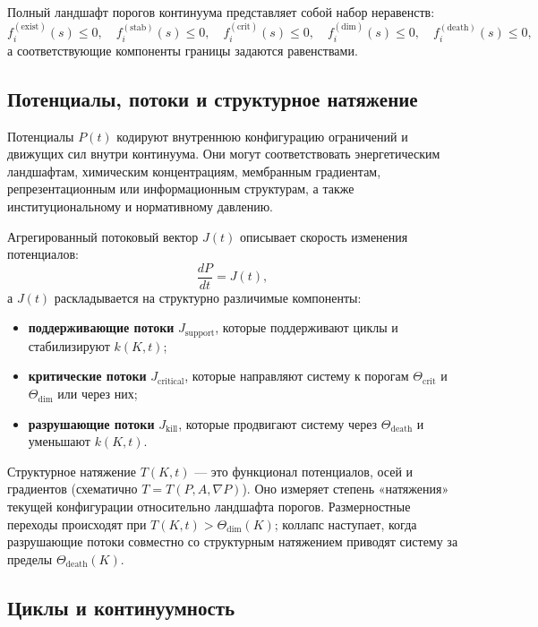 Полный ландшафт порогов континуума представляет собой набор неравенств:
\[
    f_{i}^{(\mathrm{exist})}(s) \le 0,\quad
    f_{i}^{(\mathrm{stab})}(s) \le 0,\quad
    f_{i}^{(\mathrm{crit})}(s) \le 0,\quad
    f_{i}^{(\mathrm{dim})}(s) \le 0,\quad
    f_{i}^{(\mathrm{death})}(s) \le 0,
\]
а соответствующие компоненты границы задаются равенствами.

\subsection{Потенциалы, потоки и структурное натяжение}

Потенциалы \(P(t)\) кодируют внутреннюю конфигурацию ограничений и движущих
сил внутри континуума.
Они могут соответствовать энергетическим ландшафтам, химическим концентрациям,
мембранным градиентам, репрезентационным или информационным структурам, а также
институциональному и нормативному давлению.

Агрегированный потоковый вектор \(J(t)\) описывает скорость изменения потенциалов:
\[
    \frac{dP}{dt} = J(t),
\]
а \(J(t)\) раскладывается на структурно различимые компоненты:
\begin{itemize}
    \item \textbf{поддерживающие потоки} \(J_{\mathrm{support}}\), которые поддерживают циклы и стабилизируют \(k(K,t)\);
    \item \textbf{критические потоки} \(J_{\mathrm{critical}}\), которые направляют систему к
          порогам \(\Theta_{\mathrm{crit}}\) и \(\Theta_{\mathrm{dim}}\) или через них;
    \item \textbf{разрушающие потоки} \(J_{\mathrm{kill}}\), которые продвигают систему через
          \(\Theta_{\mathrm{death}}\) и уменьшают \(k(K,t)\).
\end{itemize}

Структурное натяжение \(T(K,t)\) — это функционал потенциалов, осей и градиентов
(схематично \(T=T(P,A,\nabla P)\)).
Оно измеряет степень «натяжения» текущей конфигурации относительно ландшафта порогов.
Размерностные переходы происходят при \(T(K,t) > \Theta_{\mathrm{dim}}(K)\);
коллапс наступает, когда разрушающие потоки совместно со структурным натяжением
приводят систему за пределы \(\Theta_{\mathrm{death}}(K)\).

\subsection{Циклы и континуумность}

